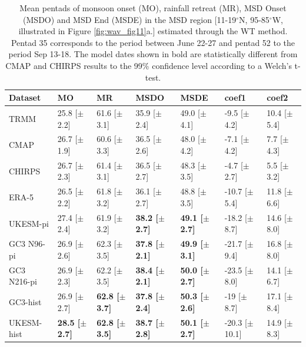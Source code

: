 \begin{table}
\caption{Mean pentads of monsoon onset (MO), rainfall retreat (MR), MSD Onset (MSDO) and MSD End (MSDE) in the MSD region [11-19$^\circ$N, 95-85$^\circ$W, illustrated in Figure \ref{fig:wav_fig11}a.] estimated through the WT method. Pentad 35 corresponds to the period between June 22-27 and pentad 52 to the period Sep 13-18. The model dates shown in bold are statistically different from CMAP and CHIRPS results to the 99\% confidence level according to a Welch's t-test. }
\label{tab:4}       %
\begin{tabular}{p{2.35cm}p{1.7cm}p{1.7cm}p{1.7cm}p{1.7cm}p{2.1cm}p{1.925cm}}
\hline\noalign{\smallskip}
Dataset & MO & MR & MSDO & MSDE & coef1 & coef2  \\ \hline
TRMM & 25.8 [$\pm$2.2] & 61.6 [$\pm$3.1] & 35.9 [$\pm$2.4] & 49.0 [$\pm$4.1] & -9.5 [$\pm$4.2] & 10.4 [$\pm$5.4]  \\
CMAP & 26.7 [$\pm$1.9] & 60.6 [$\pm$3.3] & 36.5 [$\pm$2.6] & 48.0 [$\pm$4.2] & -7.1 [$\pm$4.2] & 7.7 [$\pm$4.3]  \\
CHIRPS & 26.7 [$\pm$2.3] & 61.4 [$\pm$3.1] & 36.5 [$\pm$2.7] & 48.3 [$\pm$3.5] & -4.7 [$\pm$2.7] & 5.5 [$\pm$3.2]  \\
ERA-5 & 26.5 [$\pm$2.2] & 61.8 [$\pm$3.2] & 36.1 [$\pm$2.7] & 48.8 [$\pm$3.5] & -10.7 [$\pm$5.4] & 11.8 [$\pm$6.6]  \\
UKESM-pi & 27.4 [$\pm$2.4] & 61.9 [$\pm$3.2] & \bf{38.2} [$\pm$2.7] & \bf{49.1} [$\pm$2.7] & -18.2 [$\pm$8.7] & 14.6 [$\pm$8.0]  \\
GC3 N96-pi  & 26.9 [$\pm$2.6] & 62.3 [$\pm$3.5] & \bf{37.8} [$\pm$2.1] & \bf{49.9} [$\pm$3.1] & -21.7 [$\pm$9.4] & 16.8 [$\pm$8.0]  \\
GC3 N216-pi  & 26.9 [$\pm$2.3] & 62.2 [$\pm$3.5] & \bf{38.4} [$\pm$2.1] & \bf{50.0} [$\pm$2.7] & -23.5 [$\pm$8.0] & 14.1 [$\pm$6.7]  \\
GC3-hist & 26.9 [$\pm$2.7] & \bf{62.8} [$\pm$3.7] & \bf{37.8} [$\pm$2.4] & \bf{50.3} [$\pm$2.6] & -19 [$\pm$8.7] & 17.1 [$\pm$8.4] \\
UKESM-hist & \bf{28.5} [$\pm$2.7] & \bf{62.8} [$\pm$3.5] & \bf{38.7} [$\pm$2.8] & \bf{50.1} [$\pm$2.7] & -20.3 [$\pm$10.1] & 14.9 [$\pm$8.3]  \\
\end{tabular}
\end{table}


